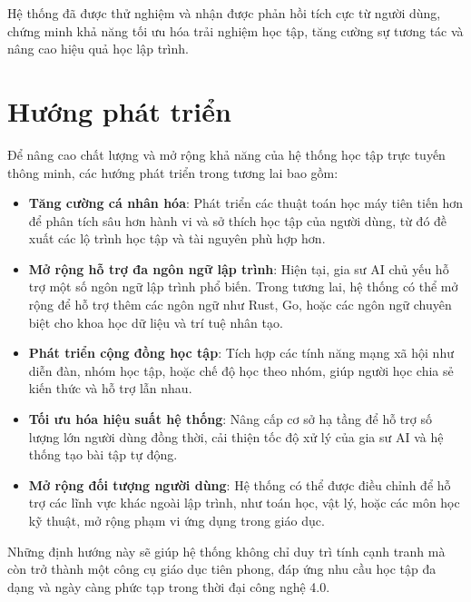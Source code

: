 Hệ thống đã được thử nghiệm và nhận được phản hồi tích cực từ người dùng, chứng minh khả năng tối ưu hóa trải nghiệm học tập, tăng cường sự tương tác và nâng cao hiệu quả học lập trình.

\section{Hướng phát triển}

Để nâng cao chất lượng và mở rộng khả năng của hệ thống học tập trực tuyến thông minh, các hướng phát triển trong tương lai bao gồm:

\begin{itemize}
	\item \textbf{Tăng cường cá nhân hóa}: Phát triển các thuật toán học máy tiên tiến hơn để phân tích sâu hơn hành vi và sở thích học tập của người dùng, từ đó đề xuất các lộ trình học tập và tài nguyên phù hợp hơn.
	\item \textbf{Mở rộng hỗ trợ đa ngôn ngữ lập trình}: Hiện tại, gia sư AI chủ yếu hỗ trợ một số ngôn ngữ lập trình phổ biến. Trong tương lai, hệ thống có thể mở rộng để hỗ trợ thêm các ngôn ngữ như Rust, Go, hoặc các ngôn ngữ chuyên biệt cho khoa học dữ liệu và trí tuệ nhân tạo.
	\item \textbf{Phát triển cộng đồng học tập}: Tích hợp các tính năng mạng xã hội như diễn đàn, nhóm học tập, hoặc chế độ học theo nhóm, giúp người học chia sẻ kiến thức và hỗ trợ lẫn nhau.
	\item \textbf{Tối ưu hóa hiệu suất hệ thống}: Nâng cấp cơ sở hạ tầng để hỗ trợ số lượng lớn người dùng đồng thời, cải thiện tốc độ xử lý của gia sư AI và hệ thống tạo bài tập tự động.
	\item \textbf{Mở rộng đối tượng người dùng}: Hệ thống có thể được điều chỉnh để hỗ trợ các lĩnh vực khác ngoài lập trình, như toán học, vật lý, hoặc các môn học kỹ thuật, mở rộng phạm vi ứng dụng trong giáo dục.
\end{itemize}

Những định hướng này sẽ giúp hệ thống không chỉ duy trì tính cạnh tranh mà còn trở thành một công cụ giáo dục tiên phong, đáp ứng nhu cầu học tập đa dạng và ngày càng phức tạp trong thời đại công nghệ 4.0.